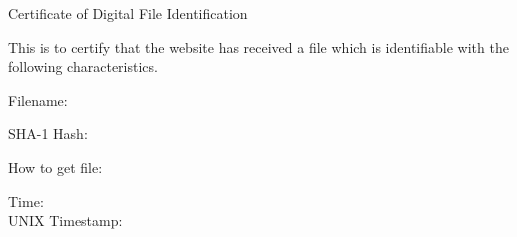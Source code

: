 \documentclass[a4paper,11pt]{article}
\begin{document}
\begin{center}
    \Large
    Certificate of Digital File Identification
\end{center}

This is to certify that the website has received a file
which is identifiable with the following characteristics.
\bigskip


Filename:\\
{\sffamily\large\bfseries\METADATAbasename}
\bigskip

SHA-1 Hash:\\
{\sffamily\METADATAhash}
\bigskip

How to get file:\\
{\sffamily\METADATAurlbyhash}
\bigskip

\qrcode[height=32mm]{\METADATAurlbyhash}



\vfill

Time: \METADATAtimeiso\\
UNIX Timestamp: \METADATAtimestamp
\end{document}
